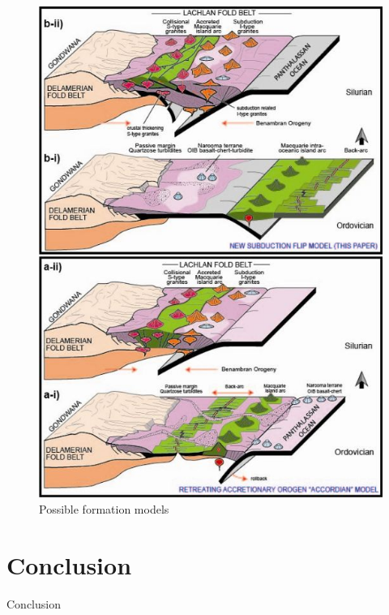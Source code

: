 \documentclass[a4paper]{article}
\begin{document}
\begin{figure}
\centering
\includegraphics[width=1\textwidth]{granite_models.jpg}
\caption{\label{fig:GraniteModels} Possible formation models}
\end{figure}







\section{Conclusion}

Conclusion


\newpage


\end{document}
